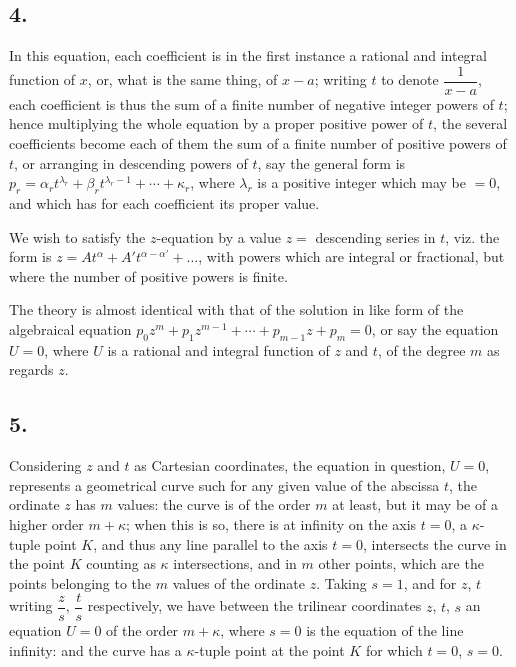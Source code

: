 \documentclass[11pt,a4paper]{book}
\begin{document}
\subsection*{4.}

In this equation, each coefficient is in the first instance a rational and integral function of $x$, or, what is the same thing, of $x - a$; writing $t$ to denote $\dfrac{1}{x - a}$, each coefficient is thus the sum of a finite number of negative integer powers of $t$; hence multiplying the whole equation by a proper positive power of $t$, the several coefficients become each of them the sum of a finite number of positive powers of $t$, or arranging in descending powers of $t$, say the general form is $p_r = \alpha_r t^{\lambda_r} + \beta_r t^{\lambda_r - 1} + \cdots + \kappa_r$, where $\lambda_r$ is a positive integer which may be $= 0$, and which has for each coefficient its proper value.

We wish to satisfy the $z$-equation by a value $z =$ descending series in $t$, viz. the form is $z = At^\alpha + A' t^{\alpha - \alpha'} + \ldots$, with powers which are integral or fractional, but where the number of positive powers is finite.

The theory is almost identical with that of the solution in like form of the algebraical equation $p_0 z^m + p_1 z^{m-1} + \cdots + p_{m-1}z + p_m = 0$, or say the equation $U = 0$, where $U$ is a rational and integral function of $z$ and $t$, of the degree $m$ as regards $z$.

\subsection*{5.}

Considering $z$ and $t$ as Cartesian coordinates, the equation in question, $U = 0$, represents a geometrical curve such for any given value of the abscissa $t$, the ordinate $z$ has $m$ values: the curve is of the order $m$ at least, but it may be of a higher order $m + \kappa$; when this is so, there is at infinity on the axis $t = 0$, a $\kappa$-tuple point $K$, and thus any line parallel to the axis $t = 0$, intersects the curve in the point $K$ counting as $\kappa$ intersections, and in $m$ other points, which are the points belonging to the $m$ values of the ordinate $z$. Taking $s = 1$, and for $z$, $t$ writing $\dfrac{z}{s}$, $\dfrac{t}{s}$ respectively, we have between the trilinear coordinates $z$, $t$, $s$ an equation $U = 0$ of the order $m + \kappa$, where $s = 0$ is the equation of the line infinity: and the curve has a $\kappa$-tuple point at the point $K$ for which $t = 0$, $s = 0$.
\end{document}
